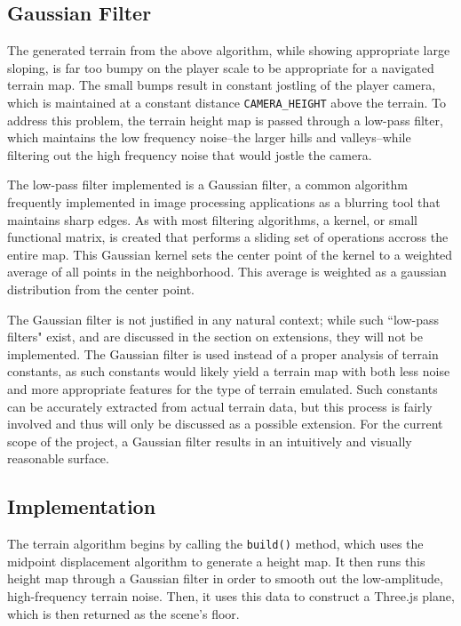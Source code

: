 \documentclass{article}
\newcommand{\tab}{\hspace*{2em}}
\begin{document}
        \subsection{Gaussian Filter}
    \tab The generated terrain from the above algorithm, while showing appropriate large sloping,
is far too bumpy on the player scale to be appropriate for a navigated terrain map. The small
bumps result in constant jostling of the player camera, which is maintained at a constant distance
\verb|CAMERA_HEIGHT| above the terrain. To address this problem, the terrain height map is passed
through a low-pass filter, which maintains the low frequency noise--the larger hills and
valleys--while filtering out the high frequency noise that would jostle the camera.

    \tab The low-pass filter implemented is a Gaussian filter, a common algorithm frequently
implemented in image processing applications as a blurring tool that maintains sharp edges. As
with most filtering algorithms, a kernel, or small functional matrix, is created that performs a
sliding set of operations accross the entire map. This Gaussian kernel sets the center point of the
kernel to a weighted average of all points in the neighborhood. This average is weighted as a gaussian
distribution from the center point.

    \tab The Gaussian filter is not justified in any natural context; while such ``low-pass filters"
exist, and are discussed in the section on extensions, they will not be implemented. The Gaussian
filter is used instead of a proper analysis of terrain constants, as such constants would likely yield 
a terrain map with both less noise and more appropriate features for the type of terrain emulated.
Such constants can be accurately extracted from actual terrain data\cite{yokoya89}, but this
process is fairly involved and thus will only be discussed as a possible extension. For the current
scope of the project, a Gaussian filter results in an intuitively and visually reasonable surface.
        \subsection{Implementation}
    \tab The terrain algorithm begins by calling the \verb|build()| method, which uses the midpoint
displacement algorithm to generate a height map. It then runs this height map through a Gaussian
filter in order to smooth out the low-amplitude, high-frequency terrain noise. Then, it uses this
data to construct a Three.js plane, which is then returned as the scene's floor.
\end{document}
